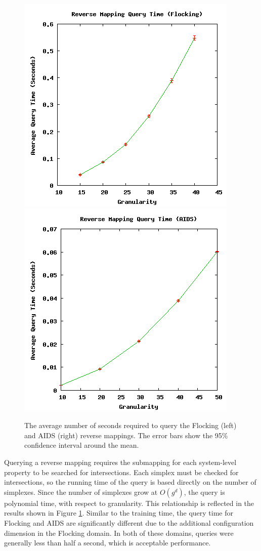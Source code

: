 \begin{figure}[ht]
\centering
\includegraphics[scale=.5]{images/results_flocking/rmquery.png}
\includegraphics[scale=.5]{images/results_aids/aids-rmquery.png}
\caption{The average number of seconds required to query the Flocking (left) and AIDS (right) reverse mappings.
The error bars show the 95\% confidence interval around the mean.}
\label{fig:farmquery}
\end{figure}



Querying a reverse mapping requires the submapping for each system-level property to be searched for intersections.
Each simplex must be checked for intersections, so the running time of the query is based directly on the number of simplexes.
Since the number of simplexes grow at $O(g^d)$, the query is polynomial time, with respect to granularity.
This relationship is reflected in the results shown in Figure \ref{fig:farmquery}.
Similar to the training time, the query time for Flocking and AIDS are significantly different due to the additional configuration dimension in the Flocking domain.
In both of these domains, queries were generally less than half a second, which is acceptable performance.



